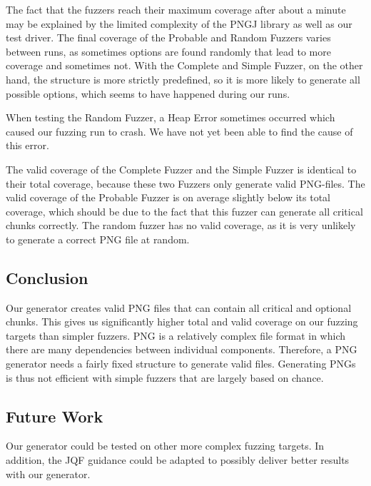 \documentclass[runningheads]{llncs}
\begin{document}
The fact that the fuzzers reach their maximum coverage after about a minute may be explained by the limited complexity of the PNGJ library as well as our test driver. The final coverage of the Probable and Random Fuzzers varies between runs, as sometimes options are found randomly that lead to more coverage and sometimes not. With the Complete and Simple Fuzzer, on the other hand, the structure is more strictly predefined, so it is more likely to generate all possible options, which seems to have happened during our runs.

When testing the Random Fuzzer, a Heap Error sometimes occurred which caused our fuzzing run to crash. We have not yet been able to find the cause of this error.

The valid coverage of the Complete Fuzzer and the Simple Fuzzer is identical to their total coverage, because these two Fuzzers only generate valid PNG-files. The valid coverage of the Probable Fuzzer is on average slightly below its total coverage, which should be due to the fact that this fuzzer can generate all critical chunks correctly. The random fuzzer has no valid coverage, as it is very unlikely to generate a correct PNG file at random.

\subsection{Conclusion}
Our generator creates valid PNG files that can contain all critical and optional chunks. This gives us significantly higher total and valid coverage on our fuzzing targets than simpler fuzzers. PNG is a relatively complex file format in which there are many dependencies between individual components. Therefore, a PNG generator needs a fairly fixed structure to generate valid files. Generating PNGs is thus not efficient with simple fuzzers that are largely based on chance.

\subsection{Future Work}
Our generator could be tested on other more complex fuzzing targets. In addition, the JQF guidance could be adapted to possibly deliver better results with our generator.
\end{document}
